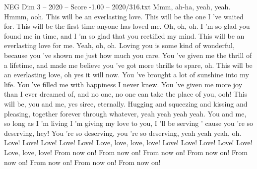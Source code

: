 \begin{textsample}{NEG Dim 3 – 2020 – Score -1.00 – 2020/316.txt}  \label{ex:f3_neg_034}
Mmm, ah-ha, yeah, yeah.
Hmmm, ooh.
This will be an everlasting love.
This will be the one I 've waited for.
This will be the first time anyone has loved me.
Oh, oh, oh.
I 'm so glad you found me in time, and I 'm so glad that you rectified my mind.
This will be an everlasting love for me.
Yeah, oh, oh.
Loving you is some kind of wonderful, because you 've shown me just how much you care.
You 've given me the thrill of a lifetime, and made me believe you 've got more thrills to spare, oh.
This will be an everlasting love, oh yes it will now.
You 've brought a lot of sunshine into my life.
You 've filled me with happiness I never knew.
You 've given me more joy than I ever dreamed of, and no one, no one can take the place of you, ooh!
This will be, you and me, yes siree, eternally.
Hugging and squeezing and kissing and pleasing, together forever through whatever, yeah yeah yeah yeah.
You and me, so long as I 'm living I 'm giving my love to you, I 'll be serving ' cause you 're so deserving, hey!
You 're so deserving, you 're so deserving, yeah yeah yeah, oh.
Love!
Love!
Love!
Love!
Love!
Love, love, love, love!
Love!
Love!
Love!
Love!
Love!
Love, love, love!
From now on!
From now on!
From now on!
From now on!
From now on!
From now on!
From now on!
From now on!

\end{textsample}
